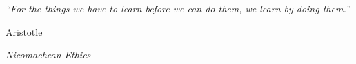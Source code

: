 \thispagestyle{empty}
\vspace*{0.34\textheight}
\begin{center}
{\Large\itshape ``For the things we have to learn before we can do them, we learn by doing them.''\par}
\vspace{12mm}
{\large Aristotle\par}
\vspace{2mm}
{\small\itshape Nicomachean Ethics\par}
\end{center}
\vfill
\clearpage
